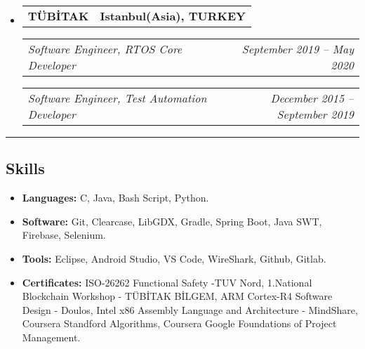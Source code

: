 \documentclass[11pt,letterpaper]{article}
\makeatletter
\newcommand{\headerrow}[2]
{\begin{tabular*}{\linewidth}{l@{\extracolsep{\fill}}r}
#1 &
#2 \\
\end{tabular*}}
\makeatother
\begin{document}
\begin{itemize}[leftmargin=1em]
	\item
	      \headerrow
	      {\textbf{TÜBİTAK}}
	      {\textbf{Istanbul(Asia), TURKEY}}
	      \headerrow
	      {\emph{Software Engineer, RTOS Core Developer}}
	      {\emph{September 2019 -- May 2020}}
	      \headerrow
	      {\emph{Software Engineer, Test Automation Developer}}
	      {\emph{December 2015 -- September 2019}}
	      	      
\end{itemize}

\hrule
\vspace{-1em}
\subsection*{\Large Skills}

\begin{itemize}[leftmargin=1em,noitemsep]
	\item \textbf{Languages:}
	      C, Java, Bash Script, Python.
	\item \textbf{Software:}
	      Git, Clearcase, LibGDX, Gradle, Spring Boot, Java SWT, Firebase, Selenium.
	\item \textbf{Tools:}
	      Eclipse, Android Studio, VS Code, WireShark, Github, Gitlab.
	\item \textbf{Certificates:}
	      ISO-26262 Functional Safety -TUV Nord, 1.National Blockchain Workshop - TÜBİTAK BİLGEM, ARM Cortex-R4 Software Design - Doulos, Intel x86 Assembly Language and Architecture - MindShare, Coursera Standford Algorithms, Coursera Google Foundations of Project Management.
\end{itemize}
\end{document}
